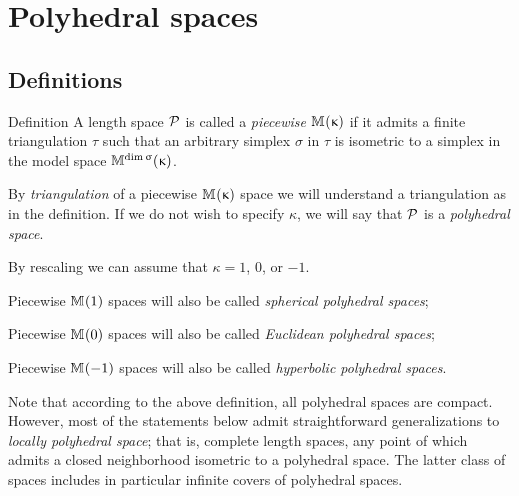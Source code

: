 \chapter{Polyhedral spaces}

\section{Definitions}

\begin{thm}{Definition}\label{def:poly}
A length space $\mathcal{P}$ is called a
\emph{piecewise $\mathbb{M}_{{}}^{}({\upkappa})$} 
if it admits a finite triangulation $\tau$ 
such that an arbitrary simplex $\sigma$ in $\tau$ is isometric to a simplex in the model space $\mathbb{M}_{{}}^{\mathop{\rm dim}\nolimits \upsigma}({\upkappa})$.

By \emph{triangulation} of a piecewise
$\mathbb{M}_{{}}^{}({\upkappa})$ space 
we will understand a triangulation as in the definition.
If we do not wish to specify $\kappa$, we will say that $\mathcal{P}$ is a \emph{polyhedral space}. 

By rescaling we can assume that $\kappa=1$, $0$, or $-1$.
\begin{subthm}{}
Piecewise $\mathbb{M}_{{}}^{}({1})$ spaces will also be 
called 
\emph{spherical polyhedral spaces};
\end{subthm}

\begin{subthm}{}
Piecewise $\mathbb{M}_{{}}^{}({0})$ spaces will also be 
called 
\emph{Euclidean polyhedral spaces};
\end{subthm}

\begin{subthm}{}
Piecewise  $\mathbb{M}_{{}}^{}({-1})$ spaces will also be 
called 
\emph{hyperbolic polyhedral spaces}.
\end{subthm}
\end{thm}

Note that according to the above definition,
all polyhedral spaces are compact.
However, 
most of the statements below admit straightforward generalizations 
to \emph{locally polyhedral space};
that is, complete length spaces,  
any point of which admits a closed neighborhood isometric to a polyhedral space.
The latter class of spaces includes in particular  infinite covers of polyhedral spaces.

